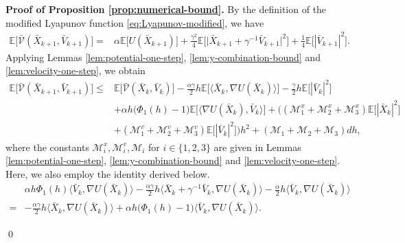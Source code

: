\documentclass[12pt]{article}
\numberwithin{equation}{section}
\renewenvironment{proof}%
  {\begin{trivlist}%
   \item[]\ignorespaces}%
  {\qed\end{trivlist}}
\newcommand{\M}{\mathcal{M}}
\begin{document}
\begin{proof}
\textbf{Proof of Proposition \ref{prop:numerical-bound}.}
By the definition of the modified Lyapunov function \eqref{eq:Lyapunov-modified}, we have
\begin{equation}
\begin{aligned}
\mathbb E
\Big[
\bar{\mathcal V}(\bar X_{k+1},\bar V_{k+1})
\Big]
=
&
\alpha\mathbb E
\Big[
U(\bar X_{k+1})
\Big]
+
\tfrac{\gamma^2}{4}
\mathbb E
\Big[
\big|
\bar X_{k+1}
+
\gamma^{-1}\bar V_{k+1}
\big|^2
\Big]
+
\tfrac14
\mathbb E
\Big[
|\bar V_{k+1}|^2
\Big].
\end{aligned}
\end{equation}
Applying Lemmas \ref{lem:potential-one-step}, \ref{lem:y-combination-bound} and \ref{lem:velocity-one-step}, we obtain
\begin{equation}
\label{eq:lyapunov-sum-before-cross}
\begin{aligned}
\mathbb E
\Big[
\bar{\mathcal V}(\bar X_{k+1},\bar V_{k+1})
\Big]
\leq&
\mathbb E
\Big[
\bar{\mathcal V}(\bar X_k,\bar V_k)
\Big]
-
\tfrac{\alpha\gamma}{2}h
\mathbb E
\Big[
\big\langle
\bar X_k,
\nabla U(\bar X_k)
\big\rangle
\Big]
-
\tfrac{\gamma}{2}h
\mathbb E
\Big[
|\bar V_k|^2
\Big]
\\
&+
\alpha h
\big(
\Phi_1(h)-1
\big)
\mathbb E
\Big[
\big\langle
\nabla U(\bar X_k),
\bar V_k
\big\rangle
\Big]
+
\Big(
(\M_1^x+\M_2^x+\M_3^x)
\mathbb E
\Big[
|\bar X_k|^2
\Big]
\\
&
+
(\M_1^v+\M_2^v+\M_3^v)
\mathbb E
\Big[
|\bar V_k|^2
\Big]
\Big)h^2
+
(\M_1+\M_2+\M_3)dh,
\end{aligned}
\end{equation}
where the constants \(\mathcal{M}^x_i,\mathcal{M}^v_i, \mathcal{M}_i\) for \(i\in\{1,2,3\}\) are given in Lemmas \ref{lem:potential-one-step}, \ref{lem:y-combination-bound} and \ref{lem:velocity-one-step}.
Here, we also employ the identity derived below.
\begin{align}
&\alpha h\Phi_1(h)
\big\langle
\bar V_k,
\nabla U(\bar X_k)
\big\rangle
-\tfrac{\alpha\gamma}{2}h
\big\langle
\bar X_k+\gamma^{-1}\bar V_k,
\nabla U(\bar X_k)
\big\rangle
-
\tfrac{\alpha}{2}h
\big\langle
\bar V_k,\nabla U(\bar X_k)
\big\rangle
\nonumber\\
=&
-\tfrac{\alpha\gamma}{2}h
\big\langle
\bar X_k,
\nabla U(\bar X_k)
\big\rangle
+
\alpha h
\big(
\Phi_1(h)-1
\big)
\big\langle
\bar V_k,\nabla U(\bar X_k)
\big\rangle .
\end{align}


\end{proof}
\end{document}
